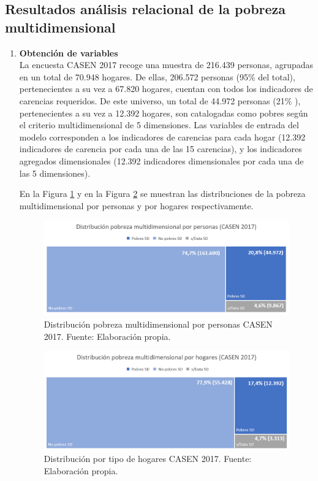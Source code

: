 \documentclass[12pt,letterpaper,spanish]{article}
\begin{document}
\subsection{Resultados análisis relacional de la pobreza multidimensional}
\begin{enumerate}
\item \textbf{Obtención de variables} \\
 La encuesta CASEN 2017 recoge una muestra de 216.439 personas, agrupadas en un total de 70.948 hogares. De ellas, 206.572 personas (95\% del total), pertenecientes a su vez a 67.820 hogares, cuentan con todos los indicadores de carencias requeridos. De este universo, un total de 44.972 personas (21\% ), pertenecientes a su vez a 12.392 hogares, son catalogadas como pobres según el criterio multidimensional de 5 dimensiones. Las variables de entrada del modelo corresponden a los indicadores de carencias para cada hogar (12.392 indicadores de carencia por cada una de las 15 carencias), y los indicadores agregados dimensionales (12.392 indicadores dimensionales por cada una de las 5 dimensiones).
 
 En la Figura \ref{pobresXpersona} y en la Figura \ref{pobresXhogar} se muestran las distribuciones de la pobreza multidimensional por personas y por hogares respectivamente.  

\begin{figure}[H]
    \centering
    \includegraphics[width=\textwidth]{Mati N/pobrezaXpersonas.png}
    \caption{Distribución pobreza multidimensional por personas CASEN 2017. Fuente: Elaboración propia.}
    \label{pobresXpersona}
\end{figure}

\begin{figure}[H]
    \centering
    \includegraphics[width=\textwidth]{Mati N/pobrezaXhogares.png}
    \caption{Distribución por tipo de hogares CASEN 2017. Fuente: Elaboración propia.}
    \label{pobresXhogar}
\end{figure}
 

\end{enumerate}
\end{document}
